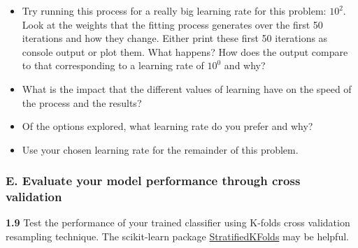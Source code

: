 \documentclass[
  letterpaper,
  DIV=11,
  numbers=noendperiod]{scrartcl}
\providecommand{\tightlist}{%
  \setlength{\itemsep}{0pt}\setlength{\parskip}{0pt}}\usepackage{longtable,booktabs,array}
\begin{document}
\begin{itemize}
\tightlist
\item
  Try running this process for a really big learning rate for this
  problem: \(10^2\). Look at the weights that the fitting process
  generates over the first 50 iterations and how they change. Either
  print these first 50 iterations as console output or plot them. What
  happens? How does the output compare to that corresponding to a
  learning rate of \(10^0\) and why?
\item
  What is the impact that the different values of learning have on the
  speed of the process and the results?
\item
  Of the options explored, what learning rate do you prefer and why?
\item
  Use your chosen learning rate for the remainder of this problem.
\end{itemize}

\subsubsection{E. Evaluate your model performance through cross
validation}\label{e.-evaluate-your-model-performance-through-cross-validation}

\textbf{1.9} Test the performance of your trained classifier using
K-folds cross validation resampling technique. The scikit-learn package
\href{http://scikit-learn.org/stable/modules/generated/sklearn.model_selection.StratifiedKFold.html\#sklearn.model_selection.StratifiedKFold}{StratifiedKFolds}
may be helpful.
\end{document}
